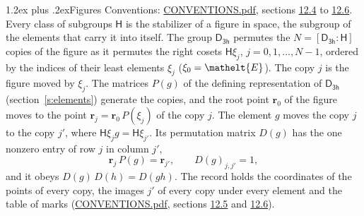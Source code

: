 \documentclass[10pt,a4paper]{article}
\makeatletter
\renewcommand\section{\@startsection{section}{1}{\z@}{-3ex plus -1ex minus -.2ex}%
  {1.2ex plus .2ex}{\normalfont\large\sffamily\bfseries\color{parttitle}}}
\numberwithin{equation}{section}
\newcommand{\eltfont}[1]{{\let\sigma\eltsigma\mathelt{#1}}}
\newcommand{\grp}[1]{\mathsf{#1}}
\newcommand{\cls}[1]{\eltfont{#1}}
\newcommand{\pointr}{\mathbf{r}}
\makeatother
\begin{document}
\section{Figures}\label{s:permutation}
Conventions: \href{../../CONVENTIONS.pdf}{CONVENTIONS.pdf}, sections \href{../../CONVENTIONS.pdf\#conv.12.4}{12.4} to \href{../../CONVENTIONS.pdf\#conv.12.6}{12.6}.
Every class of subgroups $\grp{H}$ is the stabilizer of a figure in space, the subgroup of the elements that carry it into itself. \label{n:local.orbit.size}\label{n:element.coset.least}\label{n:index.coset}The group $\grp{D_{3h}}$ permutes the $N = [\grp{D_{3h}} : \grp{H}]$ copies of the figure as it permutes the right cosets $\grp{H}\xi_j$, $j = 0, 1, \dots, N - 1$, ordered by the indices of their least elements $\xi_j$ ($\xi_0 = \cls{E}$). The copy $j$ is the figure moved by $\xi_j$. The matrices $P(g)$ of the defining representation of $\grp{D_{3h}}$ (section~\ref{s:elements}) generate the copies, and the root point $\pointr_0$ of the figure moves to the point $\pointr_j = \pointr_0\, P(\xi_j)$ of the copy $j$. \label{n:local.coset.image}The element $g$ moves the copy $j$ to the copy $j'$, where $\grp{H}\xi_j g = \grp{H}\xi_{j'}$. \label{n:local.matrix.permutation}Its permutation matrix $D(g)$ has the one nonzero entry of row $j$ in column $j'$,
\begin{equation}\label{e:perm.matrix}\pointr_j\, P(g) = \pointr_{j'}, \qquad D(g)_{j,j'} = 1,\end{equation}
and it obeys $D(g)\, D(h) = D(gh)$. The record holds the coordinates of the points of every copy, the images $j'$ of every copy under every element and the table of marks (\href{../../CONVENTIONS.pdf}{CONVENTIONS.pdf}, sections \href{../../CONVENTIONS.pdf\#conv.12.5}{12.5} and \href{../../CONVENTIONS.pdf\#conv.12.6}{12.6}).
\end{document}
